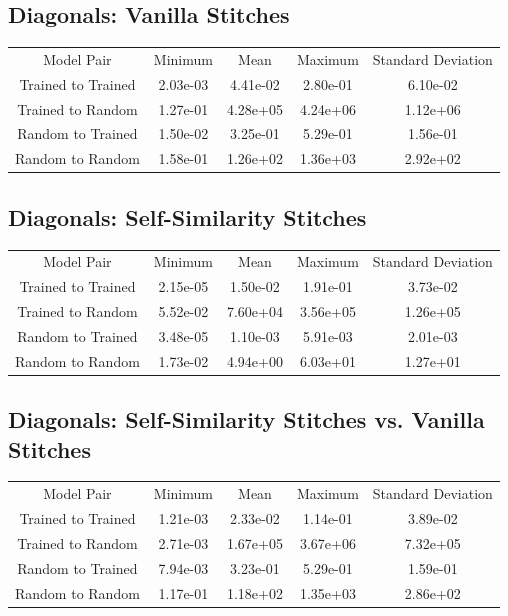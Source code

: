 \documentclass{article} %
\begin{document}
\subsection*{Diagonals: Vanilla Stitches}
\label{Table1}
\begin{tabular}{c c c c c}
   Model Pair&Minimum&Mean&Maximum&Standard Deviation\\
   Trained to Trained&2.03e-03&4.41e-02&2.80e-01&6.10e-02\\
   Trained to Random&1.27e-01&4.28e+05&4.24e+06&1.12e+06\\
   Random to Trained&1.50e-02&3.25e-01&5.29e-01&1.56e-01\\
   Random to Random&1.58e-01&1.26e+02&1.36e+03&2.92e+02\\
\end{tabular}

\label{Table2}
\subsection*{Diagonals: Self-Similarity Stitches}
\begin{tabular}{c c c c c}
   Model Pair&Minimum&Mean&Maximum&Standard Deviation\\
   Trained to Trained&2.15e-05&1.50e-02&1.91e-01&3.73e-02\\
   Trained to Random&5.52e-02&7.60e+04&3.56e+05&1.26e+05\\
   Random to Trained&3.48e-05&1.10e-03&5.91e-03&2.01e-03\\
   Random to Random&1.73e-02&4.94e+00&6.03e+01&1.27e+01\\
\end{tabular}

\label{Table3}
\subsection*{Diagonals: Self-Similarity Stitches vs. Vanilla Stitches}
\begin{tabular}{c c c c c}
   Model Pair&Minimum&Mean&Maximum&Standard Deviation\\
   Trained to Trained&1.21e-03&2.33e-02&1.14e-01&3.89e-02\\
   Trained to Random&2.71e-03&1.67e+05&3.67e+06&7.32e+05\\
   Random to Trained&7.94e-03&3.23e-01&5.29e-01&1.59e-01\\
   Random to Random&1.17e-01&1.18e+02&1.35e+03&2.86e+02\\
\end{tabular}
\end{document}
